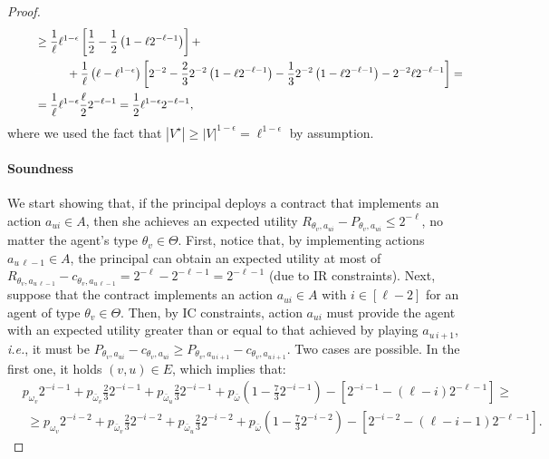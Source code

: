 \begin{proof}
\begin{align*}
		&\qquad\,\, \geq \frac{1}{\ell} \ell^{1 -\epsilon}\left[ \frac{1}{2}-\frac{1}{2} \left( 1-\ell 2^{-\ell-1} \right)\right]  + \\ 
		&\qquad\,\, \textcolor{white}{=}\qquad +\frac{1}{\ell} \left( \ell - \ell^{1-\epsilon} \right) \left[  2^{-2} -\frac{2}{3}2^{-2} \left( 1-\ell 2^{-\ell-1} \right) - \frac{1}{3} 2^{-2}  \left( 1-\ell 2^{-\ell-1} \right) - 2^{-2} \ell 2^{-\ell-1}   \right]  = \\
		&\qquad\,\, = \frac{1}{\ell} \ell^{1 -\epsilon} \frac{\ell}{2}2^{-\ell-1} = \frac{1}{2}\ell^{1-\epsilon} 2^{-\ell-1},
	\end{align*}
	where we used the fact that $|V^\star| \geq |V|^{1-\epsilon} = \ell^{1-\epsilon}$ by assumption.
	
	
	\paragraph{Soundness}
	We start showing that, if the principal deploys a contract that implements an action $a_{ui} \in A$, then she achieves an expected utility $R_{\theta_v, a_{ui}} - P_{\theta_v, a_{ui}} \leq 2^{-\ell}$, no matter the agent's type $\theta_v \in \Theta$.
	First, notice that, by implementing actions $a_{u \, \ell-1} \in A$, the principal can obtain an expected utility at most of $R_{\theta_v, a_{u \, \ell-1}} - c_{\theta_v, a_{u \, \ell-1}} = 2^{-\ell}-2^{-\ell-1}=2^{-\ell-1}$ (due to IR constraints).
	Next, suppose that the contract implements an action $a_{u i} \in A$ with $i \in [\ell-2]$ for an agent of type $\theta_v \in \Theta$.
	Then, by IC constraints, action $a_{u i}$ must provide the agent with an expected utility greater than or equal to that achieved by playing $a_{u \, i+1}$, \emph{i.e.}, it must be $P_{\theta_v, a_{ui}} - c_{\theta_v, a_{ui}} \geq P_{\theta_v, a_{u \, i+1}} - c_{\theta_v, a_{u \, i+1}}$.
	Two cases are possible.
	In the first one, it holds $(v,u) \in E$, which implies that:
	\begin{align*}
			&p_{\omega_v} 2^{-i-1} + p_{\bar \omega_v} \frac{2}{3} 2^{-i-1} + p_{\bar \omega_u} \frac{2}{3} 2^{-i-1}	+ p_{\bar \omega} \left(  1 - \frac{7}{3} 2^{-i-1} \right) - \left[  2^{-i-1} - \left( \ell-i \right) 2^{-\ell-1} \right] \geq \\
			& \,\, \geq p_{\omega_v} 2^{-i-2} + p_{\bar \omega_v} \frac{2}{3} 2^{-i-2} + p_{\bar \omega_u} \frac{2}{3} 2^{-i-2}	+ p_{\bar \omega} \left(  1 - \frac{7}{3} 2^{-i-2} \right) - \left[  2^{-i-2} - \left( \ell-i-1 \right) 2^{-\ell-1} \right].
	\end{align*}

\end{proof}
